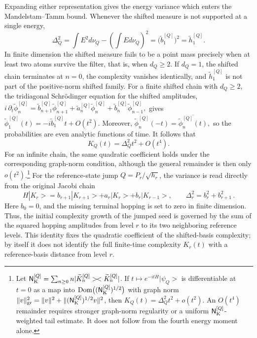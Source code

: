\documentclass[a4paper,11pt]{article}
\def\ket#1{|#1>}%
\def\bra#1{<#1|}%
\def\dd{d}%
\def\ii{i}%
\def\ee{e}%
\theoremstyle{definition}
\theoremstyle{remark}
\newcommand{\ket}[1]{|#1\rangle}
\newcommand{\bra}[1]{\langle #1|}
\newcommand{\dd}{\mathrm d}
\newcommand{\ii}{\mathrm i}
\newcommand{\ee}{\mathrm e}
\newcommand{\tphi}{\widetilde\phi}
\newcommand{\thh}{\widetilde h}
\begin{document}
Expanding either representation gives the energy variance which enters the Mandelstam--Tamm bound. Whenever the shifted measure is not supported at a single energy,
\begin{equation}
   \Delta_Q^2
   =
   \int E^2\dd\nu_Q
   -
   \left(\int E\dd\nu_Q\right)^2
   =
   \bigl(\widetilde b_1^{[Q]}\bigr)^2
   =
   \thh_1^{[Q]}.
   \label{eq:MT-speed-shifted-seed-main}
\end{equation}
In finite dimension the shifted measure fails to be a point mass precisely when at least two atoms survive the filter, that is, when $d_Q\ge2$. If $d_Q=1$, the shifted chain terminates at $n=0$, the complexity vanishes identically, and $\thh_1^{[Q]}$ is not part of the positive-norm shifted family. For a finite shifted chain with $d_Q\ge2$, the tridiagonal Schr\"odinger equation for the shifted amplitudes,
$
   \ii\,\partial_t\tphi_n^{[Q]}
   =
   \widetilde b_{n+1}^{[Q]}\tphi_{n+1}^{[Q]}
   +\widetilde a_n^{[Q]}\tphi_n^{[Q]}
   +\widetilde b_n^{[Q]}\tphi_{n-1}^{[Q]},
$
gives
$
   \tphi_1^{[Q]}(t)
   =
   -\ii\widetilde b_1^{[Q]}t+O(t^2).
$
Moreover,
$
   \tphi_n^{[Q]}(-t)=\overline{\tphi_n^{[Q]}(t)},
$
so the probabilities are even analytic functions of time. It follows that
\begin{equation}
   K_Q(t)=\Delta_Q^2t^2+O(t^4).
   \label{eq:short-time-shifted-complexity-main}
\end{equation}
For an infinite chain, the same quadratic coefficient holds under the corresponding graph-norm condition, although the general remainder is then only $o(t^2)$.\footnote{Let
$\mathsf N_{\rm K}^{[Q]}=\sum_{n\ge0}n\ket{\widetilde K_n^{[Q]}}\!\bra{\widetilde K_n^{[Q]}}$.
If
$t\mapsto\ee^{-\ii tH}\ket{\psi_Q}$
is differentiable at $t=0$ as a map into
$\operatorname{Dom}\bigl((\mathsf N_{\rm K}^{[Q]})^{1/2}\bigr)$
with graph norm
$\|v\|_{\rm gr}^2=\|v\|^2+\|(\mathsf N_{\rm K}^{[Q]})^{1/2}v\|^2$,
then
$K_Q(t)=\Delta_Q^2t^2+o(t^2)$.
An $O(t^4)$ remainder requires stronger graph-norm regularity or a uniform
$\mathsf N_{\rm K}^{[Q]}$-weighted tail estimate. It does not follow from the fourth energy moment alone.} For the reference-state jump $Q=P_r/\sqrt{h_r}$, the variance is read directly from the original Jacobi chain
\begin{equation}
   H\ket{K_r}
   =
   b_{r+1}\ket{K_{r+1}}
   +
   a_r\ket{K_r}
   +
   b_r\ket{K_{r-1}},
   \qquad
   \Delta_r^2=b_r^2+b_{r+1}^2\,.
   \label{eq:reference-state-speed-main}
\end{equation}
Here $b_0=0$, and the missing terminal hopping is set to zero in finite dimension. Thus, the initial complexity growth of the jumped seed is governed by the sum of the squared hopping amplitudes from level $r$ to its two neighboring reference levels.
This identity fixes the quadratic coefficient of the shifted-basis complexity; by itself it does not identify the full finite-time complexity $K_r(t)$ with a reference-basis distance from level $r$.
\end{document}
